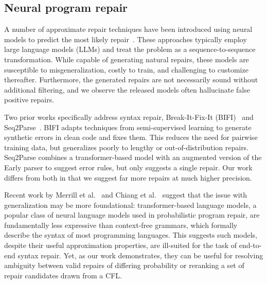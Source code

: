 \documentclass[sigplan,review,acmsmall,nonacm,screen,anonymous]{acmart}\settopmatter{printfolios=false,printccs=false,printacmref=false}
\begin{document}

\subsection{Neural program repair}

A number of approximate repair techniques have been introduced using neural models to predict the most likely repair~\cite{allamanis2021self, chirkova2021empirical, drain2021generating}. These approaches typically employ large language models (LLMs) and treat the problem as a sequence-to-sequence transformation. While capable of generating natural repairs, these models are susceptible to misgeneralization, costly to train, and challenging to customize thereafter. Furthermore, the generated repairs are not necessarily sound without additional filtering, and we observe the released models often hallucinate false positive repairs.

Two prior works specifically address syntax repair, Break-It-Fix-It (BIFI)~\cite{yasunaga2021break} and Seq2Parse~\cite{sakkas2022seq2parse}. BIFI adapts techniques from semi-supervised learning to generate synthetic errors in clean code and fixes them. This reduces the need for pairwise training data, but generalizes poorly to lengthy or out-of-distribution repairs. Seq2Parse combines a transformer-based model with an augmented version of the Early parser to suggest error rules, but only suggests a single repair. Our work differs from both in that we suggest far more repairs at much higher precision.

Recent work by Merrill et al.~\cite{merrill2022saturated} and Chiang et al.~\cite{chiang2023tighter} suggest that the issue with generalization may be more foundational: transformer-based language models, a popular class of neural language models used in probabilistic program repair, are fundamentally less expressive than context-free grammars, which formally describe the syntax of most programming languages. This suggests such models, despite their useful approximation properties, are ill-suited for the task of end-to-end syntax repair. Yet, as our work demonstrates, they can be useful for resolving ambiguity between valid repairs of differing probability or reranking a set of repair candidates drawn from a CFL.
\end{document}
